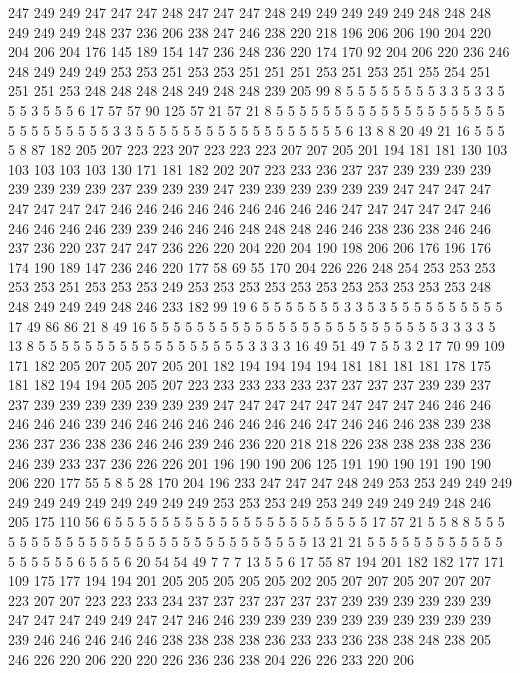 247 249 249 247 247 247 248 247 247 247 248 249 249 249 249 249 248 248 248 249
249 249 248 237 236 206 238 247 246 238 220 218 196 206 206 190 204 220 204 206
204 176 145 189 154 147 236 248 236 220 174 170 92 204 206 220 236 246 248 249
249 249 253 253 251 253 253 251 251 251 253 251 253 251 255 254 251 251 251 253
248 248 248 248 249 248 248 239 205 99 8 5 5 5 5 5 5 5 5 3
3 5 3 3 5 5 5 3 5 5 5 6 17 57 57 90 125 57 21 57
21 8 5 5 5 5 5 5 5 5 5 5 5 5 5 5 5 5 5 5
5 5 5 5 5 5 5 5 5 5 5 3 3 5 5 5 5 5 5 5
5 5 5 5 5 5 5 5 5 5 5 6 13 8 8 20 49 21 16 5
5 5 5 8 87 182 205 207 223 223 207 223 223 223 207 207 205 201 194 181
181 130 103 103 103 103 103 130 171 181 182 202 207 223 233 236 237 237 239 239
239 239 239 239 239 239 237 239 239 239 247 239 239 239 239 239 239 247 247 247
247 247 247 247 247 246 246 246 246 246 246 246 246 246 247 247 247 247 247 246
246 246 246 246 239 239 246 246 246 248 248 248 246 246 238 236 238 246 246 237
236 220 237 247 247 236 226 220 204 220 204 190 198 206 206 176 196 176 174 190
189 147 236 246 220 177 58 69 55 170 204 226 226 248 254 253 253 253 253 253
251 253 253 253 249 253 253 253 253 253 253 253 253 253 253 253 248 248 249 249
249 248 246 233 182 99 19 6 5 5 5 5 5 5 5 3 3 5 3 5
5 5 5 5 5 5 5 5 5 17 49 86 86 21 8 49 16 5 5 5
5 5 5 5 5 5 5 5 5 5 5 5 5 5 5 5 5 5 5 5
5 5 3 3 3 3 5 13 8 5 5 5 5 5 5 5 5 5 5 5
5 5 5 5 5 5 5 3 3 3 3 16 49 51 49 7 5 5 3 2
17 70 99 109 171 182 205 207 205 207 205 201 182 194 194 194 194 181 181 181
181 178 175 181 182 194 194 205 205 207 223 233 233 233 233 237 237 237 237 239
239 237 237 239 239 239 239 239 239 239 247 247 247 247 247 247 247 247 246 246
246 246 246 246 239 246 246 246 246 246 246 246 246 247 246 246 246 238 239 238
236 237 236 238 236 246 246 239 246 236 220 218 218 226 238 238 238 238 236 246
239 233 237 236 226 226 201 196 190 190 206 125 191 190 190 191 190 190 206 220
177 55 5 8 5 28 170 204 196 233 247 247 247 248 249 253 253 249 249 249
249 249 249 249 249 249 249 249 253 253 253 249 253 249 249 249 249 248 246 205
175 110 56 6 5 5 5 5 5 5 5 5 5 5 5 5 5 5 5 5
5 5 5 5 5 5 17 57 21 5 5 8 8 5 5 5 5 5 5 5
5 5 5 5 5 5 5 5 5 5 5 5 5 5 5 5 5 5 5 5
5 5 13 21 21 5 5 5 5 5 5 5 5 5 5 5 5 5 5 5
5 5 5 6 5 5 5 6 20 54 54 49 7 7 7 13 5 5 6 17
55 87 194 201 182 182 177 171 109 175 177 194 194 201 205 205 205 205 205 202
205 207 207 205 207 207 207 223 207 207 223 223 233 234 237 237 237 237 237 237
239 239 239 239 239 239 247 247 247 249 249 247 247 246 246 239 239 239 239 239
239 239 239 239 239 239 246 246 246 246 246 238 238 238 238 236 233 233 236 238
238 248 238 205 246 226 220 206 220 220 226 236 236 238 204 226 226 233 220 206
